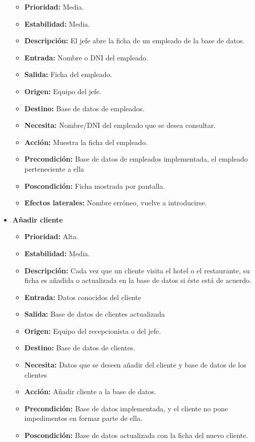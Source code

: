 \documentclass[spanish,a4paper,11pt, twoside]{report}	%
\begin{document}
\begin{itemize}
		\begin{itemize}
			\item \textbf{Prioridad: }Media.
			\item \textbf{Estabilidad: }Media.
			\item \textbf{Descripción: }El jefe abre la ficha de un empleado de la base de datos.
			\item \textbf{Entrada: } Nombre o DNI del empleado.
			\item \textbf{Salida: }Ficha del empleado.
			\item \textbf{Origen: }Equipo del jefe.
			\item \textbf{Destino: }Base de datos de empleados. 
			\item \textbf{Necesita: }Nombre/DNI del empleado que se desea consultar. 
			\item \textbf{Acción: }Muestra la ficha del empleado.
			\item \textbf{Precondición: }Base de datos de empleados implementada, el empleado perteneciente a ella
			\item \textbf{Poscondición: } Ficha mostrada por pantalla. 
			\item \textbf{Efectos laterales: } Nombre erróneo, vuelve a introducirse.

		\end{itemize}%


		\item \textbf{Añadir cliente}  %

			\begin{itemize}
			\item \textbf{Prioridad: }Alta.
			\item \textbf{Estabilidad: }Media.
			\item \textbf{Descripción: }Cada vez que un cliente visita el hotel o el restaurante, su ficha es añadida o actualizada en la base de datos si éste está de acuerdo.
			\item \textbf{Entrada: } Datos conocidos del cliente
			\item \textbf{Salida: }Base de datos de clientes actualizada
			\item \textbf{Origen: }Equipo del recepcionista o del jefe.
			\item \textbf{Destino: }Base de datos de clientes. 
			\item \textbf{Necesita: }Datos que se deseen añadir del cliente y base de datos de los clientes
			\item \textbf{Acción: }Añadir cliente a la base de datos.
			\item \textbf{Precondición: }Base de datos implementada, y el cliente no pone impedimentos en formar parte de ella.
			\item \textbf{Poscondición: }Base de datos actualizada con la ficha del nuevo cliente. 



\end{itemize}
\end{itemize}
\end{document}
